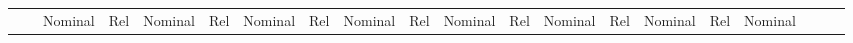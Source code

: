 \begin{table}
\begin{tabular}{llSSSSSSSSSSSSSSSSSS}
		{}                                     & {}           & {Nominal}                                 & {Rel}                                                                                                                                                                                                                                                                                                                                                                                                                      & {Nominal}                         & {Rel}                                                                                                                                                                                                                                                                                                                                                                                                                      & {Nominal}                      & {Rel}                                                                                                                                                                                                                                                                                                                                                                                                                      & {Nominal}                          & {Rel}                                                                                                                                                                                                                                                                                                                                                                                                                      & {Nominal}                                                                                                                        & {Rel}                                                                                                                                                                                                                                                                                                                                                                                                                      & {Nominal}         & {Rel}                                                                                                                                                                                                                                                                                                                                                                                                                      & {Nominal}        & {Rel}                                                                                                                                                                                                                                                                                                                                                                                                                      & {Nominal}      
\end{tabular}
\end{table}

